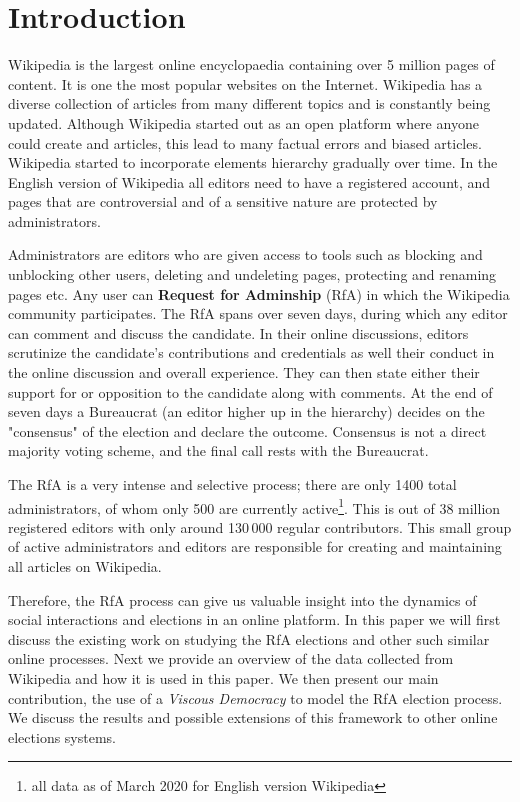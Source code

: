 \section{Introduction}
\label{sec:introduction}

Wikipedia is the largest online encyclopaedia containing over 5 million pages of content. It is one the most popular websites on the Internet. Wikipedia has a diverse collection of articles from many different topics and is constantly being updated. Although Wikipedia started out as an open platform where anyone could create and articles, this lead to many factual errors and biased articles. Wikipedia started to incorporate elements hierarchy gradually over time. In the English version of Wikipedia all editors need to have a registered account, and pages that are controversial and of a sensitive nature are protected by administrators.

Administrators are editors who are given access to tools such as blocking and unblocking other users, deleting and undeleting pages, protecting and renaming pages etc. Any user can \textbf{Request for Adminship} (RfA) in which the Wikipedia community participates. The RfA spans over seven days, during which any editor can comment and discuss the candidate. In their online discussions, editors scrutinize the candidate's contributions and credentials as well their conduct in the online discussion and overall experience. They can then state either their support for or opposition to the candidate along with comments. At the end of seven days a Bureaucrat (an editor higher up in the hierarchy) decides on the "consensus" of the election and declare the outcome. Consensus is not a direct majority voting scheme, and the final call rests with the Bureaucrat.

The RfA is a very intense and selective process; there are only 1400 total administrators, of whom only 500 are currently active\footnote{all data as of March 2020 for English version Wikipedia}. This is out of 38 million registered editors with only around 130\,000 regular contributors. This small group of active administrators and editors are responsible for creating and maintaining all articles on Wikipedia.

Therefore, the RfA process can give us valuable insight into the dynamics of social interactions and elections in an online platform. In this paper we will first discuss the existing work on studying the RfA elections and other such similar online processes. Next we provide an overview of the data collected from Wikipedia and how it is used in this paper. We then present our main contribution, the use of a \textit{Viscous Democracy} to model the RfA election process. We discuss the results and possible extensions of this framework to other online elections systems.  
